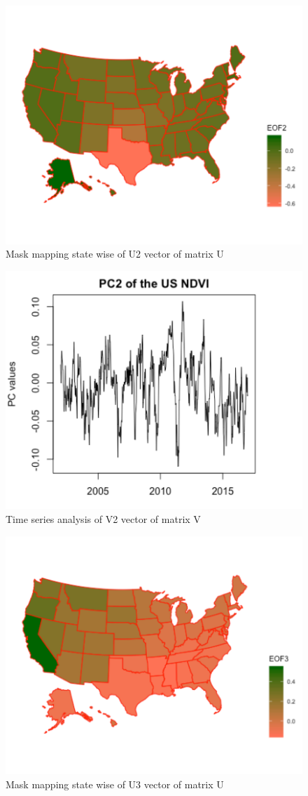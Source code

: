     \begin{figure}[H]
            \centering
            \includegraphics[width=0.70\linewidth]{figures/ch5/SVD/eof2.png}
            \caption{\label{fig:EOF_2} Mask mapping state wise of U2 vector of matrix U}
    \end{figure}
    
    \begin{figure}[H]
            \centering
            \includegraphics[width=0.70\linewidth]{figures/ch5/SVD/pc2.png}
            \caption{\label{fig:V_2} Time series analysis of V2 vector of matrix V}
    \end{figure}
    
     \begin{figure}[H]
            \centering
            \includegraphics[width=0.70\linewidth]{figures/ch5/SVD/eof3.png}
            \caption{\label{fig:EOF_3} Mask mapping state wise of U3 vector of matrix U}
    \end{figure}
    
